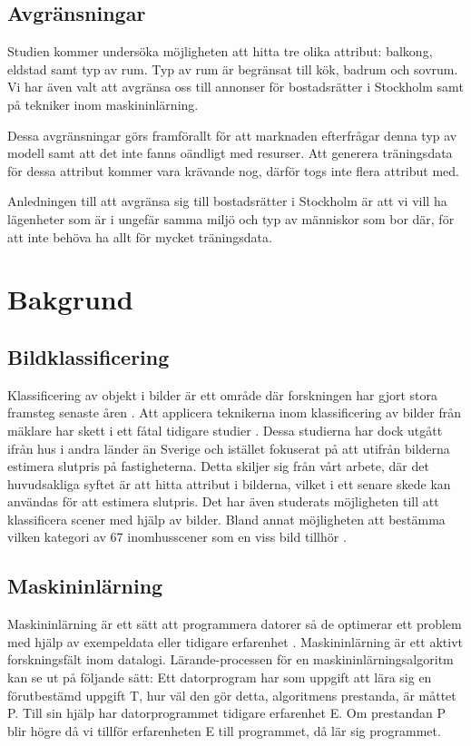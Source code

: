 \documentclass[]{kththesis}
\begin{document}
\section{Avgränsningar}
Studien kommer undersöka möjligheten att hitta tre olika attribut: balkong, eldstad samt typ av rum. Typ av rum är begränsat till kök, badrum och sovrum. Vi har även valt att avgränsa oss till annonser för bostads\-rätter i Stockholm samt på tekniker inom maskin\-inlärning. 

Dessa avgränsningar görs framförallt för att marknaden efterfrågar denna typ av modell samt att det inte fanns oändligt med resurser. Att generera träningsdata för dessa attribut kommer vara krävande nog, därför togs inte flera attribut med.

Anledningen till att avgränsa sig till bostadsrätter i Stockholm är att vi vill ha lägenheter som är i ungefär samma miljö och typ av människor som bor där, för att inte behöva ha allt för mycket träningsdata. 

\chapter{Bakgrund}
\section{Bildklassificering}
Klassificering av objekt i bilder är ett område där forskningen har gjort stora framsteg senaste åren \parencite{Goodfellow-et-al-2016}. Att applicera teknikerna inom klassificering av bilder från mäklare har skett i ett fåtal tidigare studier \parencite{cao2019classification}\parencite{poursaeed2018vision}. Dessa studierna har dock utgått ifrån hus i andra länder än Sverige och istället fokuserat på att utifrån bilderna estimera slutpris på fastigheterna. Detta skiljer sig från vårt arbete, där det huvudsakliga syftet är att hitta attribut i bilderna, vilket i ett senare skede kan användas för att estimera slutpris. Det har även studerats möjligheten till att klassificera scener med hjälp av bilder. Bland annat möjligheten att bestämma vilken kategori av 67 inomhusscener som en viss bild tillhör \parencite{zhou2014learning}.

\section{Maskininlärning}
Maskininlärning är ett sätt att programmera datorer så de optimerar ett problem med hjälp av exempeldata eller tidigare erfarenhet \parencite{alpaydin2009introduction}. Maskininlärning är ett aktivt forskningsfält inom datalogi. Lärande-processen för en maskininlärningsalgoritm kan se ut på följande sätt: Ett datorprogram har som uppgift att lära sig en förutbestämd uppgift T, hur väl den gör detta, algoritmens prestanda, är måttet P. Till sin hjälp har datorprogrammet tidigare erfarenhet E. Om prestandan P blir högre då vi tillför erfarenheten E till programmet, då lär sig programmet.
\end{document}
